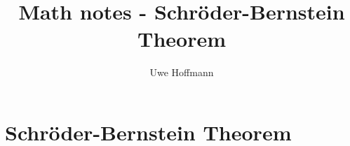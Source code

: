 


\title{Math notes - Schr\"oder-Bernstein Theorem}
\author{Uwe Hoffmann}



\setcounter{chapter}{1}
\chapter*{Schr\"oder-Bernstein Theorem}
